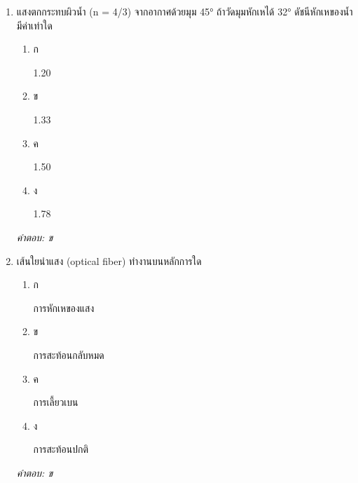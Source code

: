 \documentclass[12pt]{article}
\begin{document}
\begin{enumerate}[label=\arabic*., itemsep=0.5\baselineskip, topsep=0.5\baselineskip, leftmargin=*]
\item แสงตกกระทบผิวน้ำ (n = 4/3) จากอากาศด้วยมุม 45° ถ้าวัดมุมหักเหได้ 32° ดัชนีหักเหของน้ำมีค่าเท่าใด
\begin{enumerate}[label=\alph*)., itemsep=0.3\baselineskip, topsep=0.3\baselineskip]
\item ก\ 
\begin{minipage}[t]{0.9\linewidth}
\raggedright 1.20
\end{minipage}
\item ข\ 
\begin{minipage}[t]{0.9\linewidth}
\raggedright 1.33
\end{minipage}
\item ค\ 
\begin{minipage}[t]{0.9\linewidth}
\raggedright 1.50
\end{minipage}
\item ง\ 
\begin{minipage}[t]{0.9\linewidth}
\raggedright 1.78
\end{minipage}
\end{enumerate}
\vspace{-0.3\baselineskip}
\begin{small}
\textit{คำตอบ: ข}
\end{small}

\item เส้นใยนำแสง (optical fiber) ทำงานบนหลักการใด
\begin{enumerate}[label=\alph*)., itemsep=0.3\baselineskip, topsep=0.3\baselineskip]
\item ก\ 
\begin{minipage}[t]{0.9\linewidth}
\raggedright การหักเหของแสง
\end{minipage}
\item ข\ 
\begin{minipage}[t]{0.9\linewidth}
\raggedright การสะท้อนกลับหมด
\end{minipage}
\item ค\ 
\begin{minipage}[t]{0.9\linewidth}
\raggedright การเลี้ยวเบน
\end{minipage}
\item ง\ 
\begin{minipage}[t]{0.9\linewidth}
\raggedright การสะท้อนปกติ
\end{minipage}
\end{enumerate}
\vspace{-0.3\baselineskip}
\begin{small}
\textit{คำตอบ: ข}
\end{small}


\end{enumerate}
\end{document}
